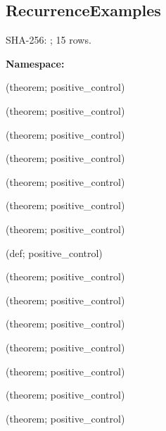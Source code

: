 \subsection*{RecurrenceExamples}
{\footnotesize SHA-256: ; 15 rows.}\par
\begingroup\small
\textbf{Namespace:} \par
\noindent{} {\scriptsize (theorem; positive\_control)}\par
\noindent{} {\scriptsize (theorem; positive\_control)}\par
\noindent{} {\scriptsize (theorem; positive\_control)}\par
\noindent{} {\scriptsize (theorem; positive\_control)}\par
\noindent{} {\scriptsize (theorem; positive\_control)}\par
\noindent{} {\scriptsize (theorem; positive\_control)}\par
\noindent{} {\scriptsize (theorem; positive\_control)}\par
\noindent{} {\scriptsize (def; positive\_control)}\par
\noindent{} {\scriptsize (theorem; positive\_control)}\par
\noindent{} {\scriptsize (theorem; positive\_control)}\par
\noindent{} {\scriptsize (theorem; positive\_control)}\par
\noindent{} {\scriptsize (theorem; positive\_control)}\par
\noindent{} {\scriptsize (theorem; positive\_control)}\par
\noindent{} {\scriptsize (theorem; positive\_control)}\par
\noindent{} {\scriptsize (theorem; positive\_control)}\par
\endgroup
